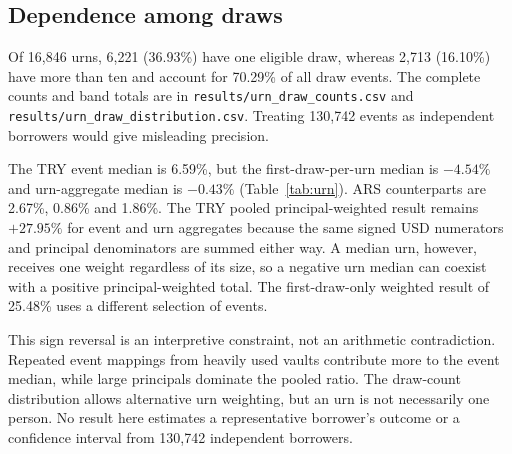 \documentclass[sn-vancouver,Numbered]{sn-jnl}
\begin{document}
\subsection{Dependence among draws}
Of 16,846 urns, 6,221 (36.93\%) have one eligible draw, whereas 2,713 (16.10\%) have more than ten and account for 70.29\% of all draw events. The complete counts and band totals are in \texttt{results/urn\_draw\_counts.csv} and \texttt{results/urn\_draw\_distribution.csv}. Treating 130,742 events as independent borrowers would give misleading precision.
\begin{table}[t]
\caption{Twelve-month hypothetical voluntary-repayment net benefit by observational unit (percent). Each urn's aggregate amount-weighted within-urn benefit is one urn unit. Weighted net pools signed benefit divided by original principal in the selected row. Rows reuse underlying draws and are not independent estimates.}
\label{tab:urn}\centering\small

\end{table}
The TRY event median is 6.59\%, but the first-draw-per-urn median is $-4.54\%$ and urn-aggregate median is $-0.43\%$ (Table~\ref{tab:urn}). ARS counterparts are 2.67\%, 0.86\% and 1.86\%. The TRY pooled principal-weighted result remains $+27.95\%$ for event and urn aggregates because the same signed USD numerators and principal denominators are summed either way. A median urn, however, receives one weight regardless of its size, so a negative urn median can coexist with a positive principal-weighted total. The first-draw-only weighted result of 25.48\% uses a different selection of events.

This sign reversal is an interpretive constraint, not an arithmetic contradiction. Repeated event mappings from heavily used vaults contribute more to the event median, while large principals dominate the pooled ratio. The draw-count distribution allows alternative urn weighting, but an urn is not necessarily one person. No result here estimates a representative borrower's outcome or a confidence interval from 130,742 independent borrowers.
\end{document}
